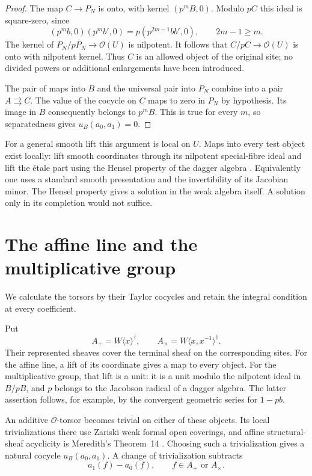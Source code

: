 \documentclass[11pt]{article}
\newcommand{\OO}{\mathcal O}\newcommand{\CC}{\mathcal C}
\theoremstyle{definition}\newtheorem{definition}[theorem]{Definition}
\theoremstyle{remark}\newtheorem{remark}[theorem]{Remark}
\begin{document}
\begin{proof}
The map $C\to P_N$ is onto, with kernel $(p^mB,0)$. Modulo $pC$ this ideal is square-zero, since
\[
 (p^mb,0)(p^mb',0)
       =p(p^{2m-1}bb',0),\qquad 2m-1\geq m.
\]
The kernel of $P_N/pP_N\to\OO(U)$ is nilpotent. It follows that $C/pC\to\OO(U)$ is onto with nilpotent kernel. Thus $C$ is an allowed object of the original site; no divided powers or additional enlargements have been introduced.

The pair of maps into $B$ and the universal pair into $P_N$ combine into a pair $A\rightrightarrows C$. The value of the cocycle on $C$ maps to zero in $P_N$ by hypothesis. Its image in $B$ consequently belongs to $p^mB$. This is true for every $m$, so separatedness gives $u_B(a_0,a_1)=0$.
\end{proof}

For a general smooth lift this argument is local on $U$. Maps into every test object exist locally: lift smooth coordinates through its nilpotent special-fibre ideal and lift the \'etale part using the Hensel property of the dagger algebra \citep[Proposition~2.31, p.~19]{DLZ}. Equivalently one uses a standard smooth presentation and the invertibility of its Jacobian minor. The Hensel property gives a solution in the weak algebra itself. A solution only in its completion would not suffice.

\section{The affine line and the multiplicative group}

We calculate the torsors by their Taylor cocycles and retain the integral condition at every coefficient.

Put
\[
 A_+=W\langle x\rangle^\dagger,
 \qquad A_\times=W\langle x,x^{-1}\rangle^\dagger.
\]
Their represented sheaves cover the terminal sheaf on the corresponding sites. For the affine line, a lift of its coordinate gives a map to every object. For the multiplicative group, that lift is a unit: it is a unit modulo the nilpotent ideal in $B/pB$, and $p$ belongs to the Jacobson radical of a dagger algebra. The latter assertion follows, for example, by the convergent geometric series for $1-pb$.

An additive $\OO$-torsor becomes trivial on either of these objects. Its local trivializations there use Zariski weak formal open coverings, and affine structural-sheaf acyclicity is Meredith's Theorem~14 \citep[p.~10]{Meredith}. Choosing such a trivialization gives a natural cocycle $u_B(a_0,a_1)$. A change of trivialization subtracts
\[
 a_1(f)-a_0(f),\qquad f\in A_+\text{ or }A_\times.
\]
\end{document}
